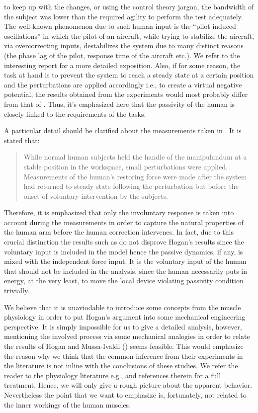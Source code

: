 to keep up with the changes, or using the control theory jargon, the bandwidth of the subject was lower than the required agility to 
perform the test adequately. The well-known phenomenon due to such human input is the \enquote{pilot induced oscillations} in which the 
pilot of an aircraft, while trying to stabilize the aircraft, via overcorrecting inputs, destabilizes the system due to many distinct 
reasons (the phase lag of the pilot, response time of the aircraft etc.). We refer to the interesting report \cite{mcruer} for a more 
detailed exposition. Also, if for some reason, the task at hand is to prevent the system to reach a steady state at a certain position 
and the perturbations are applied accordingly i.e., to create a virtual negative potential, the results obtained from the experiments 
would most probably differ from that of \cite{mussa85}. Thus, it's emphasized here that the passivity of the human is closely linked 
to the requirements of the tasks. 


\begin{rem}\label{rem:filament}
A particular detail should be clarified about the measurements taken in \cite{hogan89}. It is stated that: 
\begin{quote}
While normal human subjects held the handle of the manipulandum at a stable position
in the workspace, small perturbations were applied. Measurements
of the human's restoring force were made after the system
had returned to steady state following the perturbation but before
the onset of voluntary intervention by the subjects.
\end{quote}
Therefore, it is emphasized that only the involuntary response is taken into account during the measurements in order to
capture the natural properties of the human arm before the human correction intervenes. In fact, due to this crucial distinction
the results such as \cite{dyck2013} do not disprove Hogan's results since the voluntary input is included in the model hence the passive 
dynamics, if any, is mixed with the independent force input. It is the voluntary input of the human that should not be included in the 
analysis, since the human necessarily puts in energy, at the very least, to move the local device violating passivity condition trivially.
\end{rem}

We believe that it is unaviodable to introduce some concepts from the muscle physiology in order to put Hogan's 
argument into some mechanical engineering perspective. It is simply impossible for us to give a detailed analysis, 
however, mentioning the involved process via some mechanical analogies in order to relate the results of 
Hogan and Mussa-Ivaldi (\cite{mussa85}) seems feasible. This would emphasize the reason why we think that the common inference 
from their experiments in the literature is not inline with the conclusions of these studies. We refer the reader 
to the physiology literature e.g., \cite{spudich,millman,offer,horowits,yildiz,geeves} and references therein for a full 
treatment. Hence, we will only give a rough picture about the apparent behavior. Nevertheless the point that we want 
to emphasize is, fortunately, not related to the inner workings of the human muscles.

